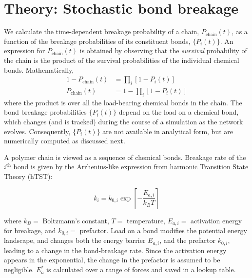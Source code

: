 \documentclass[letterpaper]{article}
\begin{document}
\section{Theory: Stochastic bond breakage}
We calculate the time-dependent breakage probability of a chain, $P_\mathrm{chain}(t)$, as a function of the breakage probabilities of its constituent bonds, $\{P_i(t)\}$. An expression for $P_\mathrm{chain}(t)$ is obtained by observing that the \emph{survival} probability of the chain is the product of the survival probabilities of the individual chemical bonds. Mathematically,
%
\begin{align}
1-P_\mathrm{chain}(t) &= \prod_i [1-P_i(t)] \nonumber\\
P_\mathrm{chain}(t)   &= 1-\prod_i [1-P_i(t)] \label{eq:pchain}
\end{align}
%
where the product is over all the load-bearing chemical bonds in the chain. The bond breakage probabilities $\{P_i(t)\}$ depend on the load on a chemical bond, which changes (and is tracked) during the course of a simulation as the network evolves. Consequently, $\{P_i(t)\}$ are not available in analytical form, but are numerically computed as discussed next.

A polymer chain is viewed as a sequence of chemical bonds. Breakage rate of the $i^\mathrm{th}$ bond is given by the Arrhenius-like expression from harmonic Transition State Theory (hTST):

\noindent
\begin{equation}
k_i = k_{0,i}\exp\left[{-\frac{E_{a,i}}{k_BT}}\right] \label{eq:htst}
\end{equation}

\noindent
where $k_B=$ Boltzmann's constant, $T=$ temperature, $E_{a,i}=$ activation energy for breakage, and $k_{0,i}=$ prefactor. Load on a bond modifies the potential energy landscape, and changes both the energy barrier $E_{a,i}$, and the prefactor $k_{0,i}$, leading to a change in the bond-breakage rate. Since the activation energy appears in the exponential, the change in the prefactor is assumed to be negligible. $E_{a}^*$ is calculated over a range of forces and saved in a lookup table.
\end{document}
